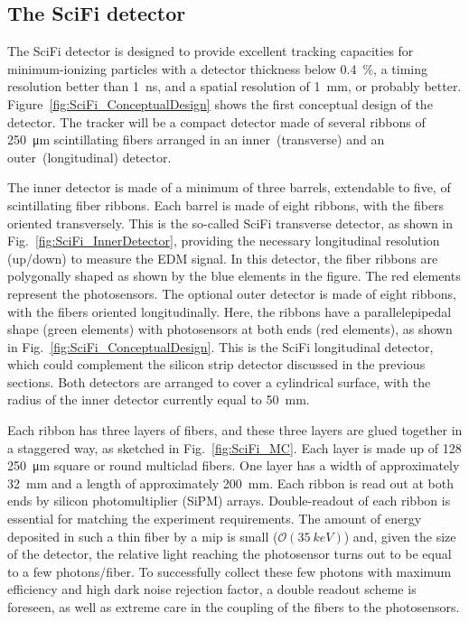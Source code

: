 \begin{refsection}
    \subsection{The SciFi detector}
        The SciFi detector is designed to provide excellent tracking capacities for minimum-ionizing particles with a detector thickness below \SI{0.4}{\%}, a timing resolution better than \SI{1}{ns}, and a spatial resolution of \SI{1}{mm}, or probably better.
        Figure~\ref{fig:SciFi_ConceptualDesign} shows the first conceptual design of the detector. The tracker will be a compact detector made of several ribbons of \SI{250}{\micro m} scintillating fibers arranged in an inner~(transverse) and an outer~(longitudinal) detector.

        The inner detector is made of a minimum of three barrels, extendable to five, of scintillating fiber ribbons. Each barrel is made of eight ribbons, with the fibers oriented transversely. This is the so-called SciFi transverse detector, as shown in Fig.~\ref{fig:SciFi_InnerDetector}, providing the necessary longitudinal resolution (up/down) to measure the EDM signal. In this detector, the fiber ribbons are polygonally shaped as shown by the blue elements in the figure. The red elements represent the photosensors. The optional outer detector is made of eight ribbons, with the fibers oriented longitudinally. Here, the ribbons have a parallelepipedal shape (green elements) with photosensors at both ends (red elements), as shown in Fig.~\ref{fig:SciFi_ConceptualDesign}. This is the SciFi longitudinal detector, which could complement the silicon strip detector discussed in the previous sections. Both detectors are arranged to cover a cylindrical surface, with the radius of the inner detector currently equal to \SI{50}{mm}.

        Each ribbon has three layers of fibers, and these three layers are glued together in a staggered way, as sketched in Fig.~\ref{fig:SciFi_MC}. Each layer is made up of 128 \SI{250}{\micro m} square or round multiclad fibers. One layer has a width of approximately \SI{32}{mm} and a length of approximately \SI{200}{mm}. Each ribbon is read out at both ends by silicon photomultiplier (SiPM) arrays. Double-readout of each ribbon is essential for matching the experiment requirements. The amount of energy deposited in such a thin fiber by a mip is small ($\mathcal{O}(\SI{35}{keV})$) and, given the size of the detector, the relative light reaching the photosensor turns out to be equal to a few photons/fiber. 
        To successfully collect these few photons with maximum efficiency and high dark noise rejection factor, a double readout scheme is foreseen, as well as extreme care in the coupling of the fibers to the photosensors.


\end{refsection}
